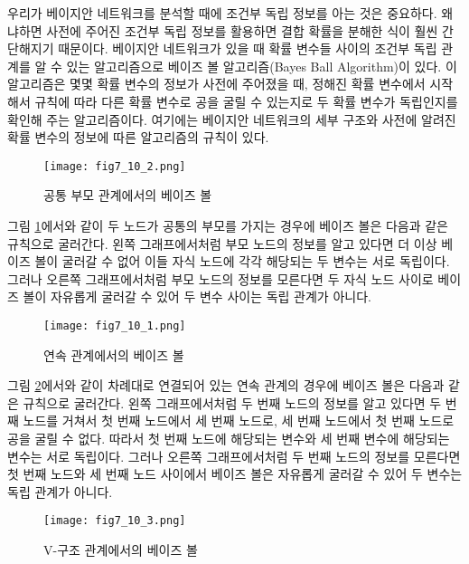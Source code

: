 \documentclass[a4paper]{oblivoir}
\begin{document}
우리가 베이지안 네트워크를 분석할 때에 조건부 독립 정보를 아는 것은 중요하다. 왜냐하면 사전에 주어진 조건부 독립 정보를 활용하면 결합 확률을 분해한 식이 훨씬 간단해지기 때문이다. 베이지안 네트워크가 있을 때 확률 변수들 사이의 조건부 독립 관계를 알 수 있는 알고리즘으로 베이즈 볼 알고리즘(Bayes Ball Algorithm)이 있다. 이 알고리즘은 몇몇 확률 변수의 정보가 사전에 주어졌을 때, 정해진 확률 변수에서 시작해서  규칙에 따라 다른 확률 변수로 공을 굴릴 수 있는지로 두 확률 변수가 독립인지를 확인해 주는 알고리즘이다. 여기에는 베이지안 네트워크의 세부 구조와 사전에 알려진 확률 변수의 정보에 따른 알고리즘의 규칙이 있다. \\ 

\begin{figure}[ht] \centering 
\texttt{[image: fig7\_10\_2.png]} 
\caption{공통 부모 관계에서의 베이즈 볼}
\label{fig:7-10-2}
\end{figure} 

그림 \ref{fig:7-10-2}에서와 같이 두 노드가 공통의 부모를 가지는 경우에 베이즈 볼은 다음과 같은 규칙으로 굴러간다. 왼쪽 그래프에서처럼 부모 노드의 정보를 알고 있다면 더 이상 베이즈 볼이 굴러갈 수 없어 이들 자식 노드에 각각 해당되는 두 변수는 서로 독립이다. 그러나 오른쪽 그래프에서처럼 부모 노드의 정보를 모른다면 두 자식 노드 사이로 베이즈 볼이 자유롭게 굴러갈 수 있어 두 변수 사이는 독립 관계가 아니다.  \\ 

\begin{figure}[ht] \centering 
\texttt{[image: fig7\_10\_1.png]} 
\caption{연속 관계에서의 베이즈 볼}
\label{fig:7-10-1}
\end{figure} 

그림 \ref{fig:7-10-1}에서와 같이 차례대로 연결되어 있는 연속 관계의 경우에 베이즈 볼은 다음과 같은 규칙으로 굴러간다. 왼쪽 그래프에서처럼 두 번째 노드의 정보를 알고 있다면 두 번째 노드를 거쳐서 첫 번째 노드에서 세 번째 노드로, 세 번째 노드에서 첫 번째 노드로 공을 굴릴 수 없다. 따라서 첫 번째 노드에 해당되는 변수와 세 번째 변수에 해당되는 변수는 서로 독립이다. 그러나 오른쪽 그래프에서처럼 두 번째 노드의 정보를 모른다면 첫 번째 노드와 세 번째 노드 사이에서 베이즈 볼은 자유롭게 굴러갈 수 있어 두 변수는 독립 관계가 아니다. \\ 

\begin{figure}[ht] \centering 
\texttt{[image: fig7\_10\_3.png]} 
\caption{V-구조 관계에서의 베이즈 볼}
\label{fig:7-10-3}
\end{figure} 
\end{document}

